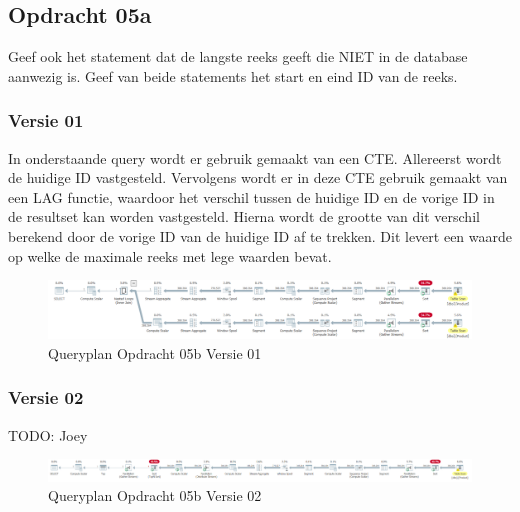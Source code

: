 \subsection{Opdracht 05a}
Geef ook het statement dat de langste reeks geeft die NIET in de database aanwezig is. Geef van beide statements het start en eind ID van de reeks.

\subsubsection{Versie 01}

    In onderstaande query wordt er gebruik gemaakt van een CTE. Allereerst wordt de huidige ID vastgesteld. Vervolgens wordt er in deze
    CTE gebruik gemaakt van een LAG functie, waardoor het verschil tussen de huidige ID en de vorige ID in de resultset kan worden vastgesteld.
    Hierna wordt de grootte van dit verschil berekend door de vorige ID van de huidige ID af te trekken. Dit levert een waarde op welke
    de maximale reeks met lege waarden bevat.


\begin{figure}[H]
    \centering
    \includegraphics[width=1\textwidth]{image/marc/opdracht-05b.PNG}
    \caption{Queryplan Opdracht 05b Versie 01}
\end{figure}

\subsubsection{Versie 02}
TODO: Joey

\begin{figure}[H]
    \centering
    \includegraphics[width=1\textwidth]{image/joey/opdracht-05b.PNG}
    \caption{Queryplan Opdracht 05b Versie 02}
\end{figure}

